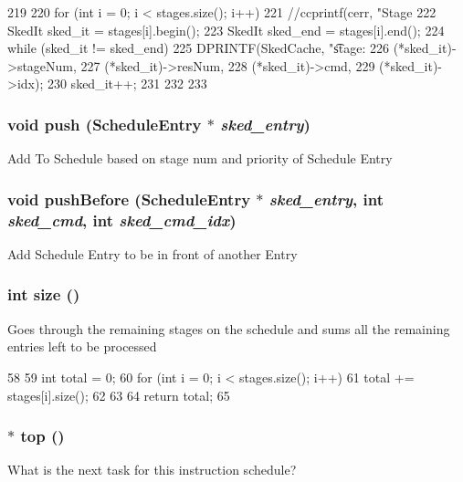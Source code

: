 \begin{DoxyCode}
219 {
220     for (int i = 0; i < stages.size(); i++) {
221         //ccprintf(cerr, "Stage %
222         SkedIt sked_it = stages[i].begin();
223         SkedIt sked_end = stages[i].end();
224         while (sked_it != sked_end) {
225             DPRINTF(SkedCache, "\t stage:%
226                     (*sked_it)->stageNum,
227                     (*sked_it)->resNum,
228                     (*sked_it)->cmd,
229                     (*sked_it)->idx);
230             sked_it++;
231         }
232     }
233 }
\end{DoxyCode}
\hypertarget{classResourceSked_aa963665051eed3db02917334982edc22}{
\subsubsection[{push}]{\setlength{\rightskip}{0pt plus 5cm}void push ({\bf ScheduleEntry} $\ast$ {\em sked\_\-entry})}}
\label{classResourceSked_aa963665051eed3db02917334982edc22}
Add To Schedule based on stage num and priority of Schedule Entry \hypertarget{classResourceSked_a9284522561e5c9c0e38d75fd9264374e}{
\subsubsection[{pushBefore}]{\setlength{\rightskip}{0pt plus 5cm}void pushBefore ({\bf ScheduleEntry} $\ast$ {\em sked\_\-entry}, \/  int {\em sked\_\-cmd}, \/  int {\em sked\_\-cmd\_\-idx})}}
\label{classResourceSked_a9284522561e5c9c0e38d75fd9264374e}
Add Schedule Entry to be in front of another Entry \hypertarget{classResourceSked_af4b57d21919c42d55af03391f91a1c08}{
\subsubsection[{size}]{\setlength{\rightskip}{0pt plus 5cm}int size ()}}
\label{classResourceSked_af4b57d21919c42d55af03391f91a1c08}
Goes through the remaining stages on the schedule and sums all the remaining entries left to be processed 


\begin{DoxyCode}
58 {
59     int total = 0;
60     for (int i = 0; i < stages.size(); i++) {
61         total += stages[i].size();
62     }
63 
64     return total;
65 }
\end{DoxyCode}
\hypertarget{classResourceSked_ade2a2e6ba16898f027e8269832f46da3}{
\subsubsection[{top}]{ $\ast$ top ()}}
\label{classResourceSked_ade2a2e6ba16898f027e8269832f46da3}
What is the next task for this instruction schedule? 


